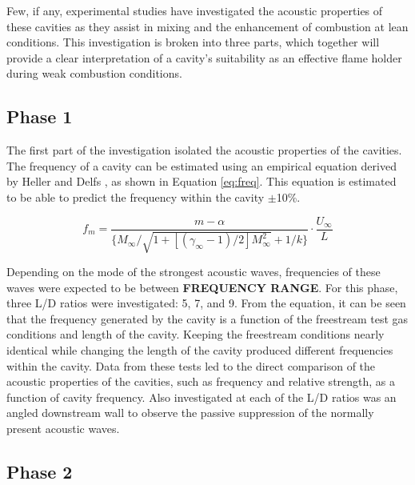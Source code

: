Few, if any, experimental studies have investigated the acoustic properties of these cavities as they assist in mixing and the enhancement of combustion at lean conditions. This investigation is broken into three parts, which together will provide a clear interpretation of a cavity's suitability as an effective flame holder during weak combustion conditions. 


\subsection{Phase 1}

The first part of the investigation isolated the acoustic properties of the cavities. The frequency of a cavity can be estimated using an empirical equation derived by Heller and Delfs \cite{heller1996letter}, as shown in Equation \ref{eq:freq}. This equation is estimated to be able to predict the frequency within the cavity $\pm$10\%\cite{heller1996letter}.

\begin{equation}
f_m = \frac{m-\alpha}{\{M_{\infty}/\sqrt{1+[(\gamma_{\infty}-1)/2]M_{\infty}^2}+1/k\}} \cdot \frac{U_\infty}{L}
\label{eq:freq}
\end{equation}

Depending on the mode of the strongest acoustic waves, frequencies of these waves were expected to be between \textbf{FREQUENCY RANGE}. For this phase, three L/D ratios were investigated: 5, 7, and 9. From the equation, it can be seen that the frequency generated by the cavity is a function of the freestream test gas conditions and length of the cavity. Keeping the freestream conditions nearly identical while changing the length of the cavity produced different frequencies within the cavity. Data from these tests led to the direct comparison of the acoustic properties of the cavities, such as frequency and relative strength, as a function of cavity frequency. Also investigated at each of the L/D ratios was an angled downstream wall to observe the passive suppression of the normally present acoustic waves.


\subsection{Phase 2}

